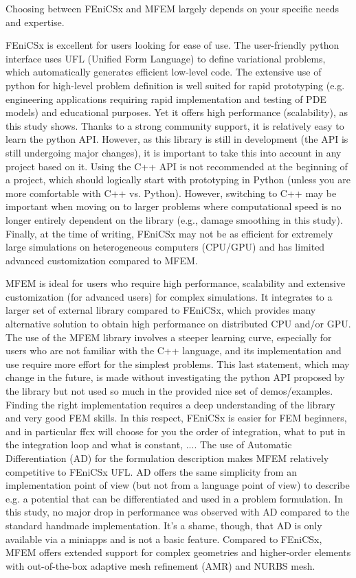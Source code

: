 \documentclass[12pt]{article}
\newcommand{\f}[1]{FEniCSx#1}
\begin{document}
Choosing between \f{} and MFEM largely depends on your specific needs and expertise. 

\bigskip
\f{} is excellent for users looking for ease of use.
The user-friendly python interface uses UFL (Unified Form Language) to define variational problems, which automatically generates efficient low-level code.
The extensive use of python for high-level problem definition is well suited for rapid prototyping (e.g. engineering applications requiring rapid implementation and testing of PDE models) and educational purposes.
Yet it offers high performance (scalability), as this study shows.
Thanks to a strong community support, it is relatively easy to learn the python API. However, as this library is still in development (the API is still undergoing major changes), it is important to take this into account in any project based on it.  
Using the C++ API is not recommended at the beginning of a project, which should logically start with prototyping in Python (unless you are more comfortable with C++ vs. Python).
However, switching to C++ may be important when moving on to larger problems where computational speed is no longer entirely dependent on the library (e.g., damage smoothing in this study).
Finally, at the time of writing, \f{} may not be as efficient for extremely large simulations on heterogeneous computers (CPU/GPU) and has limited advanced customization compared to MFEM.

\bigskip

MFEM is ideal for users who require high performance, scalability and extensive customization (for advanced users) for complex simulations.
It integrates to a larger set of external library compared to \f{}, which provides many alternative solution to obtain high performance on distributed CPU and/or GPU.
The use of the MFEM library involves a steeper learning curve, especially for users who are not familiar with the C++ language, and its implementation and use require more effort for the simplest problems. 
This last statement, which may change in the future, is made without investigating the python API proposed by the library but not used so much in the provided nice set of demos/examples.
Finding the right implementation requires a deep understanding of the library and very good FEM skills. In this respect, \f{} is easier for FEM beginners, and in particular ffcx will choose for you the order of integration, what to put in the integration loop and what is constant, .... 
The use of Automatic Differentiation (AD) for the formulation description makes MFEM relatively competitive to \f{} UFL. 
AD offers the same simplicity from an implementation point of view (but not from a language point of view) to describe e.g. a potential that can be differentiated and used in a problem formulation.
In this study, no major drop in performance was observed with AD compared to the standard handmade implementation.
It's a shame, though, that AD is only available via a miniapps and is not a basic feature.  
Compared to \f{}, MFEM offers extended support for complex geometries and higher-order elements with out-of-the-box adaptive mesh refinement (AMR) and NURBS mesh.
\end{document}
